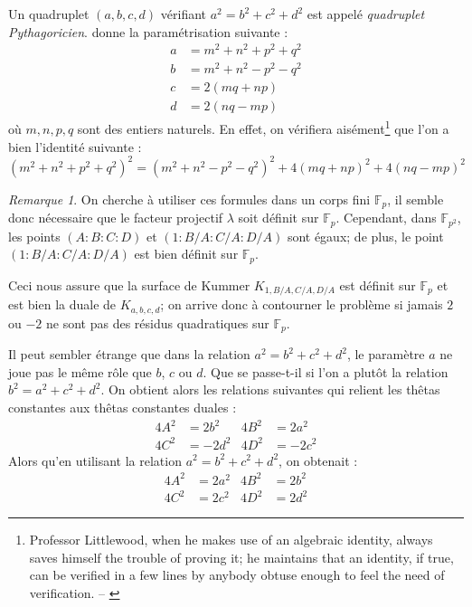 \documentclass[a4paper,12pt]{article}
\theoremstyle{definition}
\theoremstyle{remark}
\newtheorem{remarque}{Remarque}
\numberwithin{equation}{section}
\begin{document}
Un quadruplet $(a,b,c,d)$ vérifiant $a^2 = b^2 + c^2 + d^2$ est appelé \emph{quadruplet Pythagoricien}. \citet{mordell} donne la paramétrisation suivante :
\begin{align*}
a &= m^2 + n^2 + p^2 + q^2 \\
b &= m^2 + n^2 - p^2 - q^2 \\
c &= 2(mq+np) \\
d &= 2(nq-mp)
\end{align*}
où $m,n,p,q$ sont des entiers naturels. En effet, on vérifiera aisément\footnote{Professor Littlewood, when he makes use of an algebraic identity, always saves himself the trouble of proving it;
he maintains that an identity, if true, can be verified in a few
lines by anybody obtuse enough to feel the need of verification. -- \citet{dyson}} que l'on a bien l'identité suivante :
$$(m^2 + n^2 + p^2 + q^2)^2 = (m^2 + n^2 - p^2 - q^2)^2 + 4(mq+np)^2 + 4(nq-mp)^2$$

\begin{remarque}
On cherche à utiliser ces formules dans un corps fini $\mathbb{F}_p$, il semble donc nécessaire que le facteur projectif $\lambda$ soit définit sur $\mathbb{F}_p$. Cependant, dans $\mathbb{F}_{p^2}$, les points $(A:B:C:D)$ et $(1:B/A:C/A:D/A)$ sont égaux; de plus, le point $(1:B/A:C/A:D/A)$ est bien définit sur $\mathbb{F}_p$.

Ceci nous assure que la surface de Kummer $K_{1,B/A,C/A,D/A}$ est définit sur $\mathbb{F}_p$ et est bien la duale de $K_{a,b,c,d}$; on arrive donc à contourner le problème si jamais $2$ ou $-2$ ne sont pas des résidus quadratiques sur $\mathbb{F}_p$.
\end{remarque}


Il peut sembler étrange que dans la relation $a^2 = b^2 + c^2 + d^2$, le paramètre $a$ ne joue pas le même rôle que $b$, $c$ ou $d$. Que se passe-t-il si l'on a plutôt la relation $b^2 = a^2 + c^2 + d^2$. On obtient alors les relations suivantes qui relient les thêtas constantes aux thêtas constantes duales :
\begin{align*}
4A^2 &= 2b^2  &4B^2 &= 2a^2 \\
4C^2 &= -2d^2  &4D^2 &= -2c^2
\end{align*}
Alors qu'en utilisant la relation $a^2 = b^2 + c^2 + d^2$, on obtenait :
\begin{align*}
4A^2 &= 2a^2  &4B^2 &= 2b^2 \\
4C^2 &= 2c^2  &4D^2 &= 2d^2
\end{align*}
\end{document}
